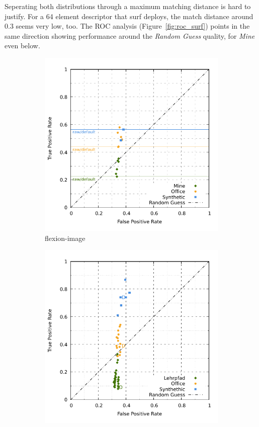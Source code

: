 Seperating both distributions through a maximum matching distance is hard to justify.
For a 64 element descriptor that \acrshort{surf} deploys, the match distance around \num{0.3} seems very low, too.
The \acrshort{ROC} analysis (Figure~\ref{fig:roc_surf}) points in the same direction showing performance around the \emph{Random Guess} quality, for \emph{Mine} even below.
\begin{figure}[b!]
\begin{subfigure}[t]{0.45\linewidth}
    \includegraphics[width=\linewidth]{chapter06/results/SURF/flexion/roc.pdf}%
    \caption{\gls{flexion-image}}
\end{subfigure}\quad
\begin{subfigure}[t]{0.45\linewidth}
    \includegraphics[width=\linewidth]{chapter06/results/SURF/bearing/roc.pdf}

\end{subfigure}
\end{figure}
